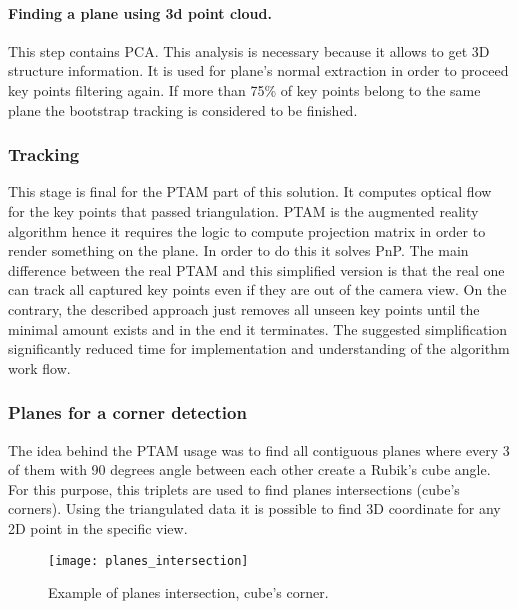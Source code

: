 \documentclass[../../main]{subfiles}
\begin{document}
\paragraph*{Finding a plane using 3d point cloud.}

This step contains \ac{PCA}. This analysis is necessary because it allows to get 3D structure information. It is used for plane's normal extraction in order to proceed key points filtering again. If more than 75\% of key points belong to the same plane the bootstrap tracking is considered to be finished.

\subsubsection{Tracking}

This stage is final for the \ac{PTAM} part of this solution. It computes optical flow for the key points that passed triangulation. \ac{PTAM} is the augmented reality algorithm hence it requires the logic to compute projection matrix in order to render something on the plane. In order to do this it solves \ac{PnP}.
The main difference between the real \ac{PTAM} and this simplified version is that the real one can track all captured key points even if they are out of the camera view. On the contrary, the described approach just removes all unseen key points until the minimal amount exists and in the end it terminates. The suggested simplification significantly reduced time for implementation and understanding of the algorithm work flow.

\subsubsection{Planes for a corner detection}

The idea behind the \ac{PTAM} usage was to find all contiguous planes where every 3 of them with 90 degrees angle between each other create a Rubik's cube angle. For this purpose, this triplets are used to find planes intersections (cube's corners). Using the triangulated data it is possible to find 3D coordinate for any 2D point in the specific view.

\begin{figure} [ht]
    \begin{center}
        \texttt{[image: planes\_intersection]}
        \caption{Example of planes intersection, cube's corner.}
        \label{fig:planes_intersection}
    \end{center}
\end{figure}
\end{document}
